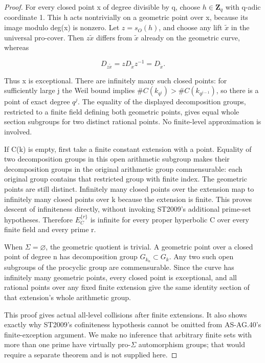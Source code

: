 \begin{proof}
For every closed point x of degree divisible by q, choose \(h{\in}\mathbf{Z}_q\) with q-adic coordinate 1. This h acts nontrivially on a geometric point over x, because its image modulo deg(x) is nonzero. Let \(z=s_O(h)\), and choose any lift \(\tilde{x}\) in the universal pro-cover. Then \(z\tilde{x}\) differs from \(\tilde{x}\) already on the geometric curve, whereas

\[D_{z\tilde{x}}=zD_{\tilde{x}}z^{-1}=D_{\tilde{x}}.\]

Thus x is exceptional. There are infinitely many such closed points: for sufficiently large j the Weil bound implies \(\#C(k_{q^j})>\#C(k_{q^{j-1}})\), so there is a point of exact degree \(q^j\). The equality of the displayed decomposition groups, restricted to a finite field defining both geometric points, gives equal whole section subgroups for two distinct rational points. No finite-level approximation is involved.

If C(k) is empty, first take a finite constant extension with a point. Equality of two decomposition groups in this open arithmetic subgroup makes their decomposition groups in the original arithmetic group commensurable: each original group contains that restricted group with finite index. The geometric points are still distinct. Infinitely many closed points over the extension map to infinitely many closed points over k because the extension is finite. This proves descent of infiniteness directly, without invoking ST2009's additional prime-set hypotheses. Therefore \(E_C^{\{r\}}\) is infinite for every proper hyperbolic C over every finite field and every prime r.

When \(\Sigma=\varnothing\), the geometric quotient is trivial. A geometric point over a closed point of degree n has decomposition group \(G_{k_n}\subset G_k\). Any two such open subgroups of the procyclic group are commensurable. Since the curve has infinitely many geometric points, every closed point is exceptional, and all rational points over any fixed finite extension give the same identity section of that extension's whole arithmetic group.

This proof gives actual all-level collisions after finite extensions. It also shows exactly why ST2009's cofiniteness hypothesis cannot be omitted from AS-AG.40's finite-exception argument. We make no inference that arbitrary finite sets with more than one prime have virtually pro-\({\Sigma}\) automorphism groups; that would require a separate theorem and is not supplied here.


\end{proof}

